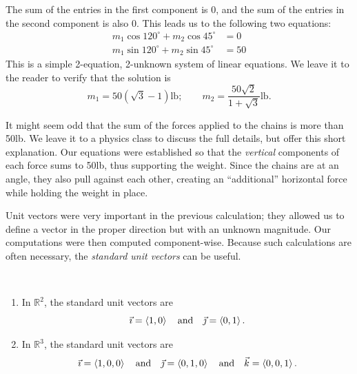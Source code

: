 \begin{example}
The sum of the entries in the first component is 0, and the sum of the entries in the second component is also 0. This leads us to the following two equations:
\begin{align*}
m_1\cos120^\circ + m_2\cos45^\circ &=0 \\
m_1\sin120^\circ + m_2\sin45^\circ &=50
\end{align*}
This is a simple 2-equation, 2-unknown system of linear equations. We leave it to the reader to verify that the solution is 
\[
m_1=50(\sqrt{3}-1)\text{lb}%
;\qquad
m_2=\frac{50\sqrt{2}}{1+\sqrt{3}}\text{lb}.%
\]

It might seem odd that the sum of the forces applied to the chains is more than 50lb. We leave it to a physics class to discuss the full details, but offer this short explanation. Our equations were established so that the \emph{vertical} components of each force sums to 50lb, thus supporting the weight. Since the chains are at an angle, they also pull against each other, creating an ``additional'' horizontal force while holding the weight in place.
\end{example}

Unit vectors were very important in the previous calculation; they allowed us to define a vector in the proper direction but with an unknown magnitude. Our computations were then computed component-wise. Because such calculations are often necessary, the \emph{standard unit vectors} can be useful.

\begin{definition}\label{def:standard_unit}%
%
\mbox{}\\[-2\baselineskip]\parbox[t]{\linewidth}{\begin{enumerate}
	\item In $\mathbb{R}^2$, the standard unit vectors are
	\[\vec\imath =\left\langle 1,0\right\rangle\quad \text{and}\quad \vec\jmath =\left\langle 0,1\right\rangle.\]
	\item In $\mathbb{R}^3$, the standard unit vectors are
	\[\vec\imath =\left\langle 1,0,0\right\rangle\quad \text{and}\quad \vec\jmath =\left\langle 0,1,0\right\rangle\quad \text{and}\quad \vec k =\left\langle 0,0,1\right\rangle.\]
\end{enumerate}}
\end{definition}

